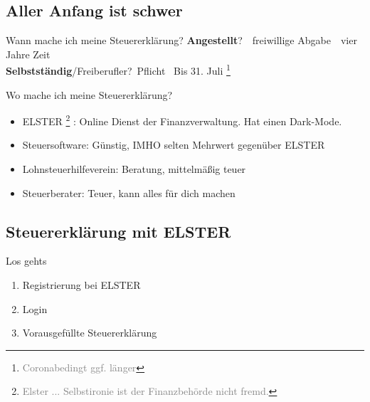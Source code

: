 \documentclass{beamer}
\newcommand{\n}{\hfill\\\vspace{0.25cm}}
\let\oldfootnote\footnote
\renewcommand{\footnote}[1]
{%
	\oldfootnote
	{
		\tiny
		\textcolor{gray}{#1}
	}%
}
\begin{document}
		\subsection{Aller Anfang ist schwer}
		
			\begin{frame}{Wann mache ich meine Steuererklärung?}
				\textbf{Angestellt}?\ \textrightarrow\ freiwillige Abgabe\ \textrightarrow\ vier Jahre Zeit\n
				\textbf{Selbstständig}/Freiberufler?\ \textrightarrow Pflicht \textrightarrow\ Bis 31. Juli\footnote{Coronabedingt ggf. länger}
			\end{frame}

			\begin{frame}{Wo mache ich meine Steuererklärung?}
				\begin{itemize}
					\item ELSTER\footnote{Elster ... Selbstironie ist der Finanzbehörde nicht fremd.}: Online Dienst der Finanzverwaltung. Hat einen Dark-Mode.
					\item Steuersoftware: Günstig, IMHO selten Mehrwert gegenüber ELSTER
					\item Lohnsteuerhilfeverein: Beratung, mittelmäßig teuer
					\item Steuerberater: Teuer, kann alles für dich machen
				\end{itemize}
			\end{frame}
		
		\subsection{Steuererklärung mit ELSTER}
		
			\begin{frame}{Los gehts}
				\begin{enumerate}
					\item Registrierung bei ELSTER
					\item Login
					\item Vorausgefüllte Steuererklärung
				\end{enumerate}
			\end{frame}
		
\end{document}
